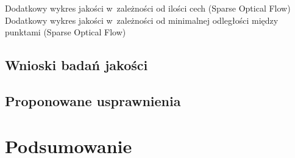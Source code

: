   Dodatkowy wykres jakości w~zależności od ilości cech (Sparse Optical Flow)
  Dodatkowy wykres jakości w~zależności od minimalnej odległości między punktami (Sparse Optical Flow)

  \section{Wnioski badań jakości}\label{Section_QualityWnioski}

  \section{Proponowane usprawnienia}\label{Section_Usprawnienia}

\chapter{Podsumowanie}\label{Section_Podsumowanie}